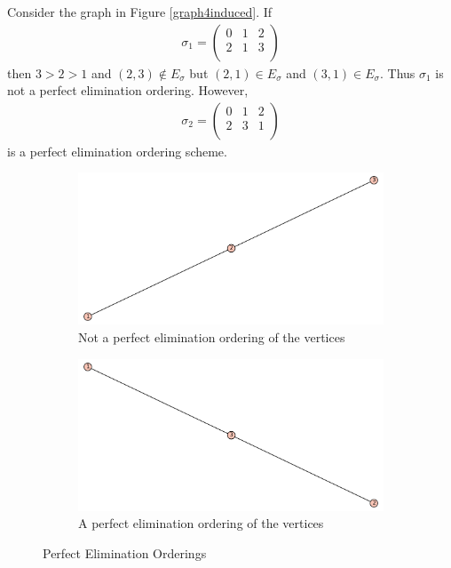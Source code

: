 \documentclass[12pt, leqno]{article}
\begin{document}
Consider the graph in Figure
\ref{graph4induced}. If 
\begin{align*}
\sigma_1 = \begin{pmatrix} 0 &1 & 2 \\
2 & 1 & 3 \\
\end{pmatrix}
\end{align*}
then $3>2>1$ and $(2,3) \not\in  E_{\sigma}$ but $(2,1) \in
E_{\sigma}$ and $(3,1) \in  E_{\sigma}$.
Thus $\sigma_1$ is not a perfect elimination ordering. However,
\begin{align*}
\sigma_2 = \begin{pmatrix} 0 &1 & 2 \\
2 & 3 & 1 \\
\end{pmatrix}
\end{align*}
is a perfect elimination ordering scheme.
\begin{figure}
\centering
\begin{subfigure}{.5\textwidth}
  \centering
  \includegraphics [scale=0.3]{h07.pdf}
\caption{Not a perfect elimination ordering of the vertices}
  \label{notperfect}
\end{subfigure}%
\begin{subfigure}{.5\textwidth}
  \centering
  \includegraphics [scale=0.3]{h08.pdf}
  \caption{A perfect elimination ordering of the vertices}
  \label{perfect}
\end{subfigure}
\caption{Perfect Elimination Orderings}
\label{Perfectorder}
\end{figure}
\end{document}
